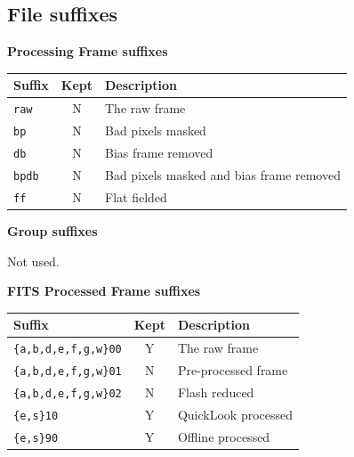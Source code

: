 \documentclass[twoside,11pt]{article}
\renewcommand{\_}{\texttt{\symbol{95}}}
\begin{document}
\subsection{File suffixes}

\textbf{Processing Frame suffixes}

\vspace{0.2cm}

\begin{tabular}{l c l}
\hline
Suffix & Kept & Description \hspace{9cm}  \\
\hline
{\tt \_raw} & N & The raw frame\\
{\tt \_bp}  & N & Bad pixels masked\\
{\tt \_db}  & N & Bias frame removed\\
{\tt \_bp\_db}  & N & Bad pixels masked and bias frame removed\\
{\tt \_ff}  & N & Flat fielded\\
\hline
\end{tabular}

\vspace{0.5cm}

\textbf{Group suffixes}

\vspace{0.2cm}

Not used.

\vspace{0.5cm}

\textbf{FITS Processed Frame suffixes}

\vspace{0.2cm}

\begin{tabular}{l c l}
\hline
Suffix & Kept & Description \hspace{9cm}  \\
\hline
{\tt \_\{a,b,d,e,f,g,w\}00} & Y & The raw frame\\
{\tt \_\{a,b,d,e,f,g,w\}01}  & N & Pre-processed frame\\
{\tt \_\{a,b,d,e,f,g,w\}02}  & N & Flash reduced\\
{\tt \_\{e,s\}10}  & Y & QuickLook processed\\
{\tt \_\{e,s\}90}  & Y & Offline processed\\
\hline
\end{tabular}
\end{document}

